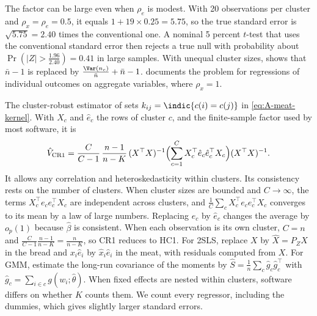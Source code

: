 The factor can be large even when $\rho_e$ is modest. With 20 observations per cluster and $\rho_x = \rho_e = 0.5$,
it equals $1 + 19 \times 0.25 = 5.75$, so the true standard error is $\sqrt{5.75} = 2.40$ times the conventional one.
A nominal 5 percent $t$-test that uses the conventional standard error then rejects a true null with probability
about $\Pr(|Z| > \frac{1.96}{2.40}) = 0.41$ in large samples. With unequal cluster sizes, \citet{Moulton1986} shows
that $\bar n - 1$ is replaced by $\frac{\Var(n_c)}{\bar n} + \bar n - 1$. \citet{Moulton1990} documents the problem
for regressions of individual outcomes on aggregate variables, where $\rho_x = 1$.

The cluster-robust estimator of \citet{LiangZeger1986} sets $k_{ij} = \indic\{c(i) = c(j)\}$ in
\eqref{eq:A-meat-kernel}. With $X_c$ and $\hat e_c$ the rows of cluster $c$, and the finite-sample factor used by
most software, it is
\begin{equation}\label{eq:A-cr1}
  \hat V_{\text{CR1}} = \frac{C}{C - 1}\,\frac{n - 1}{n - K}\,(X^\top X)^{-1}\Bigl(\sum_{c=1}^{C}X_c^\top\hat e_c\hat e_c^\top
  X_c\Bigr)(X^\top X)^{-1}.
\end{equation}
It allows any correlation and heteroskedasticity within clusters. Its consistency rests on the number of clusters.
When cluster sizes are bounded and $C \to \infty$, the terms $X_c^\top e_ce_c^\top X_c$ are independent across
clusters, and $\frac{1}{C}\sum_cX_c^\top e_ce_c^\top X_c$ converges to its mean by a law of large numbers.
Replacing $e_c$ by $\hat e_c$ changes the average by $o_p(1)$ because $\hat\beta$ is consistent. When each
observation is its own cluster, $C = n$ and $\frac{C}{C - 1}\frac{n - 1}{n - K} = \frac{n}{n - K}$, so CR1 reduces
to HC1. For 2SLS, replace $X$ by $\hat X = P_ZX$ in the bread and $x_i\hat e_i$ by $\hat x_i\hat e_i$ in the meat,
with residuals computed from $X$. For GMM, estimate the long-run covariance of the moments by
$\hat S = \frac{1}{n}\sum_c\hat g_c\hat g_c^\top$ with $\hat g_c = \sum_{i \in c}g(w_i;\hat\theta)$. When fixed
effects are nested within clusters, software differs on whether $K$ counts them. We count every regressor,
including the dummies, which gives slightly larger standard errors.

